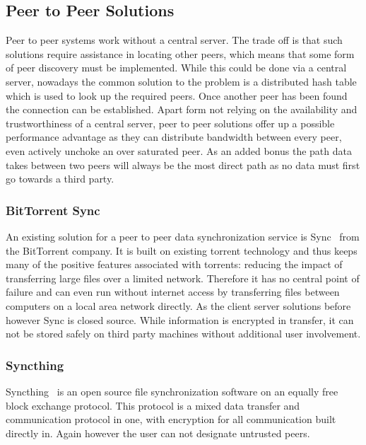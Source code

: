 \subsection{Peer to Peer Solutions}

Peer to peer systems work without a central server.
The trade off is that such solutions require assistance in locating other peers, which means that some form of peer discovery must be implemented.
While this could be done via a central server, nowadays the common solution to the problem is a distributed hash table which is used to look up the required peers.
Once another peer has been found the connection can be established.
Apart form not relying on the availability and trustworthiness of a central server, peer to peer solutions offer up a possible performance advantage as they can distribute bandwidth between every peer, even actively unchoke an over saturated peer.
As an added bonus the path data takes between two peers will always be the most direct path as no data must first go towards a third party.

\subsubsection{BitTorrent Sync}
\label{subs:BitTorrent Sync}

An existing solution for a peer to peer data synchronization service is Sync~\cite{web:site:bittorrent_sync} from the BitTorrent company.
It is built on existing torrent technology and thus keeps many of the positive features associated with torrents: reducing the impact of transferring large files over a limited network.
Therefore it has no central point of failure and can even run without internet access by transferring files between computers on a local area network directly.
As the client server solutions before however Sync is closed source.
While information is encrypted in transfer, it can not be stored safely on third party machines without additional user involvement.

\subsubsection{Syncthing}
\label{subs:Syncthing}

Syncthing~\cite{web:site:synthing} is an open source file synchronization software on an equally free block exchange protocol.
This protocol is a mixed data transfer and communication protocol in one, with encryption for all communication built directly in.
Again however the user can not designate untrusted peers.

